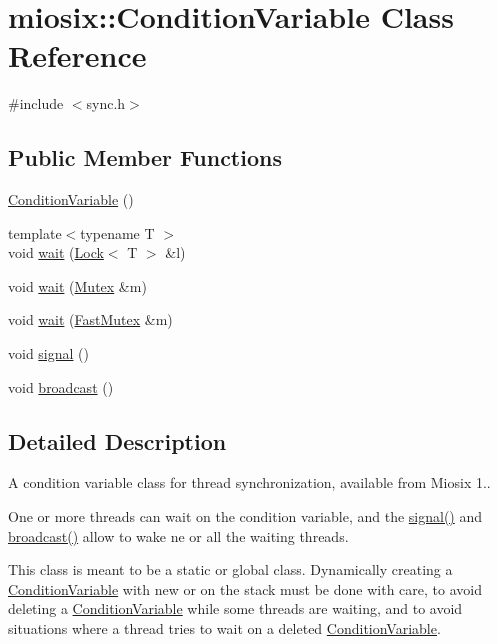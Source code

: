 \hypertarget{classmiosix_1_1_condition_variable}{\section{miosix\-:\-:Condition\-Variable Class Reference}
\label{classmiosix_1_1_condition_variable}
}


{\ttfamily \#include $<$sync.\-h$>$}

\subsection*{Public Member Functions}
\begin{DoxyCompactItemize}
\item 
\hyperlink{classmiosix_1_1_condition_variable_a071791f7cf57c7f6eed03b17cbb4bb5e}{Condition\-Variable} ()
\item 
{\footnotesize template$<$typename T $>$ }\\void \hyperlink{classmiosix_1_1_condition_variable_a7fb5a24d48ff29770f994f025d02967c}{wait} (\hyperlink{classmiosix_1_1_lock}{Lock}$<$ T $>$ \&l)
\item 
void \hyperlink{classmiosix_1_1_condition_variable_a690ff38de87f884855d6c72bde694116}{wait} (\hyperlink{classmiosix_1_1_mutex}{Mutex} \&m)
\item 
void \hyperlink{classmiosix_1_1_condition_variable_a87382101d2526494b8fe04e056426ccb}{wait} (\hyperlink{classmiosix_1_1_fast_mutex}{Fast\-Mutex} \&m)
\item 
void \hyperlink{classmiosix_1_1_condition_variable_adbc51a45a48f6afe98fea4581fc4f16d}{signal} ()
\item 
void \hyperlink{classmiosix_1_1_condition_variable_adb8897a2ff31ecc320ff624285924600}{broadcast} ()
\end{DoxyCompactItemize}


\subsection{Detailed Description}
A condition variable class for thread synchronization, available from Miosix 1..\par
 One or more threads can wait on the condition variable, and the \hyperlink{classmiosix_1_1_condition_variable_adbc51a45a48f6afe98fea4581fc4f16d}{signal()} and \hyperlink{classmiosix_1_1_condition_variable_adb8897a2ff31ecc320ff624285924600}{broadcast()} allow to wake ne or all the waiting threads.\par
 This class is meant to be a static or global class. Dynamically creating a \hyperlink{classmiosix_1_1_condition_variable}{Condition\-Variable} with new or on the stack must be done with care, to avoid deleting a \hyperlink{classmiosix_1_1_condition_variable}{Condition\-Variable} while some threads are waiting, and to avoid situations where a thread tries to wait on a deleted \hyperlink{classmiosix_1_1_condition_variable}{Condition\-Variable}.\par
 

